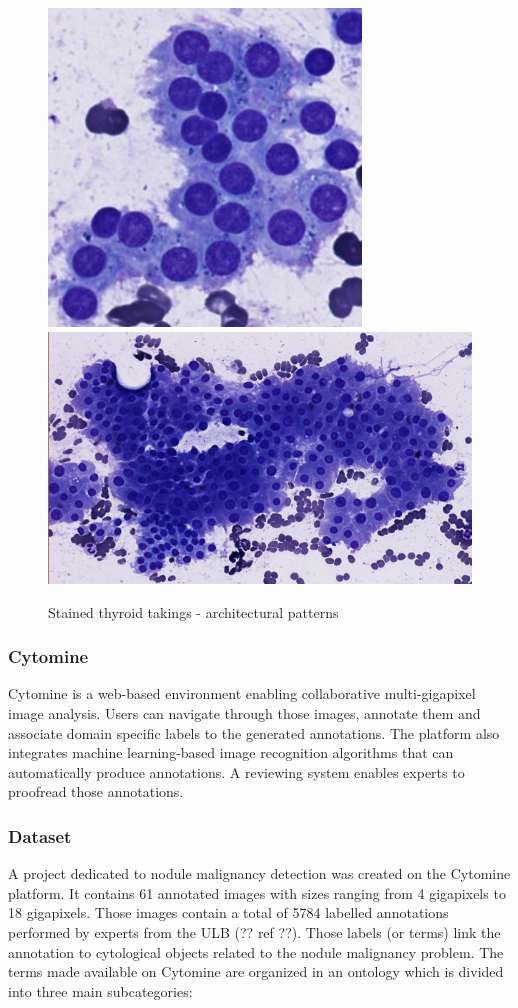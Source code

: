 \begin{figure}
{		\includegraphics[scale=0.5]{image/normal_pattern_1.png}
		\includegraphics[scale=0.5]{image/normal_pattern_2.png}
		\label{sfig:norm_patterns}
	}
	\caption{Stained thyroid takings - architectural patterns}
	\label{fig:intro_pattern_ex}
\end{figure}

\subsubsection{Cytomine} 
\label{sssec:detect_cytomine}
Cytomine \cite{maree2016collaborative} is a web-based environment enabling collaborative multi-gigapixel image analysis. Users can navigate through those images, annotate them and associate domain specific labels to the generated annotations. The platform also integrates machine learning-based image recognition algorithms that can automatically produce annotations. A reviewing system enables experts to proofread those annotations. 

\subsubsection{Dataset}
\label{sssec:detection_thyroid_dataset}
A project dedicated to nodule malignancy detection was created on the Cytomine platform. It contains 61 annotated images with sizes ranging from 4 gigapixels to 18 gigapixels. Those images contain a total of 5784 labelled annotations performed by experts from the ULB (?? ref ??). Those labels (or terms) link the annotation to cytological objects related to the nodule malignancy problem. The terms made available on Cytomine are organized in an ontology which is divided into three main subcategories:

